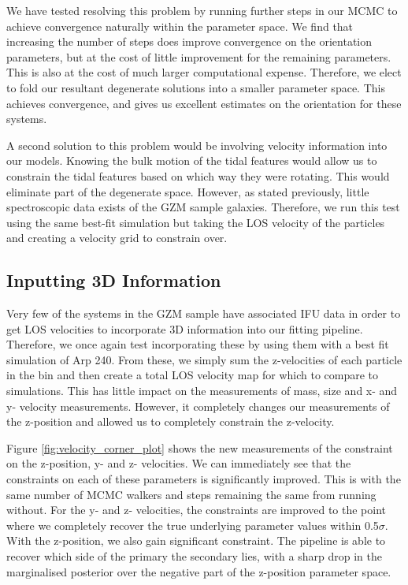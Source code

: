 We have tested resolving this problem by running further steps in our MCMC to achieve convergence naturally within the parameter space. We find that increasing the number of steps does improve convergence on the orientation parameters, but at the cost of little improvement for the remaining parameters. This is also at the cost of much larger computational expense. Therefore, we elect to fold our resultant degenerate solutions into a smaller parameter space. This achieves convergence, and gives us excellent estimates on the orientation for these systems.

A second solution to this problem would be involving velocity information into our models. Knowing the bulk motion of the tidal features would allow us to constrain the tidal features based on which way they were rotating. This would eliminate part of the degenerate space. However, as stated previously, little spectroscopic data exists of the GZM sample galaxies. Therefore, we run this test using the same best-fit simulation but taking the LOS velocity of the particles and creating a velocity grid to constrain over.

\subsection{Inputting 3D Information}
Very few of the systems in the GZM sample have associated IFU data in order to get LOS velocities to incorporate 3D information into our fitting pipeline. Therefore, we once again test incorporating these by using them with a best fit simulation of Arp 240. From these, we simply sum the z-velocities of each particle in the bin and then create a total LOS velocity map for which to compare to simulations. This has little impact on the measurements of mass, size and x- and y- velocity measurements. However, it completely changes our measurements of the z-position and allowed us to completely constrain the z-velocity. 

Figure \ref{fig:velocity_corner_plot} shows the new measurements of the constraint on the z-position, y- and z- velocities. We can immediately see that the constraints on each of these parameters is significantly improved. This is with the same number of MCMC walkers and steps remaining the same from running without. For the y- and z- velocities, the constraints are improved to the point where we completely recover the true underlying parameter values within 0.5$\sigma$. With the z-position, we also gain significant constraint. The pipeline is able to recover which side of the primary the secondary lies, with a sharp drop in the marginalised posterior over the negative part of the z-position parameter space.

